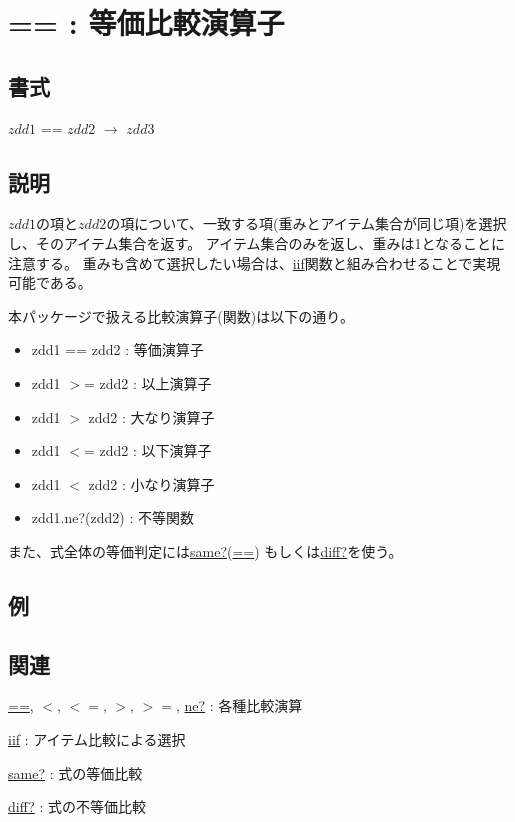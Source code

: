 
\section{== : 等価比較演算子\label{sect:eq}}
\subsection*{書式}
$zdd1$ == $zdd2$ $\rightarrow$ $zdd3$

\subsection*{説明}
$zdd1$の項と$zdd2$の項について、一致する項(重みとアイテム集合が同じ項)を選択し、そのアイテム集合を返す。
アイテム集合のみを返し、重みは1となることに注意する。
重みも含めて選択したい場合は、\hyperref[sect:iif]{iif}関数と組み合わせることで実現可能である。

本パッケージで扱える比較演算子(関数)は以下の通り。
\begin{itemize}
\item zdd1 == zdd2   : 等価演算子
\item zdd1 $>$= zdd2   : 以上演算子
\item zdd1 $>$  zdd2   : 大なり演算子
\item zdd1 $<$= zdd2   : 以下演算子
\item zdd1 $<$  zdd2   : 小なり演算子
\item zdd1.ne?(zdd2) : 不等関数
\end{itemize}

また、式全体の等価判定には\hyperref[sect:same?]{same?}(\hyperref[sect:same?]{==})
もしくは\hyperref[sect:diff?]{diff?}を使う。

\subsection*{例}


\subsection*{関連}
\hyperref[sect:eq]{==},
\hyperref[sect:lt]{$<$},
\hyperref[sect:le]{$<=$},
\hyperref[sect:gt]{$>$},
\hyperref[sect:ge]{$>=$},
\hyperref[sect:ne]{ne?} : 各種比較演算

\hyperref[sect:iif]{iif} : アイテム比較による選択

\hyperref[sect:same?]{same?} : 式の等価比較

\hyperref[sect:diff?]{diff?} : 式の不等価比較

